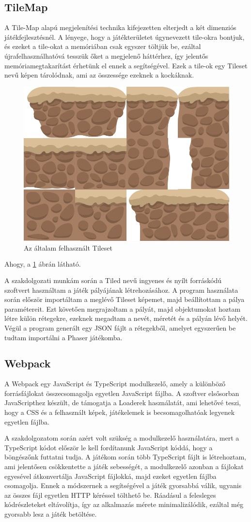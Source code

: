 \documentclass[12pt, a4paper]{report}
\theoremstyle{definition}
\begin{document}
	\subsection{TileMap}
	A Tile-Map alapú megjelenítési technika kifejezetten elterjedt a két dimenziós játékfejlesztésnél. A lényege, hogy a játékterületet úgynevezett tile-okra bontjuk, és ezeket a tile-okat a memóriában csak egyszer töltjük be, ezáltal újrafelhasználhatóvá tesszük őket a megjelenő háttérhez, így jelentős memóriamegtakarítást érhetünk el ennek a segítségével. Ezek a tile-ok egy Tileset nevű képen tárolódnak, ami az összessége ezeknek a kockáknak.
	\begin{figure}[!h]
		\centering
		\includegraphics[width=0.4\linewidth]{./images/tile.png}
		\caption{Az általam felhasznált Tileset}
		\label{fig:tileset}
	\end{figure}
	Ahogy, a \ref{fig:tileset} ábrán látható.
	
	A szakdolgozati munkám során a Tiled nevű ingyenes és nyílt forráskódú szoftvert használtam a játék pályájának létrehozásához. A program használata során először importáltam a meglévő Tileset képemet, majd beállítottam a pálya paramétereit. Ezt követően megrajzoltam a pályát, majd objektumokat hoztam létre külön rétegekre, ezeknek megadtam a nevét, méretét és a pályán lévő helyét. Végül a program generált egy JSON fájlt a rétegekből, amelyet egyszerűen be tudtam importálni a Phaser játékomba.  
	
	
	\subsection{Webpack}
	A Webpack egy JavaScript és TypeScript modulkezelő, amely a különböző forrásfájlokat összecsomagolja egyetlen JavaScript fájlba. A szoftver elsősorban JavaScripthez készült, de támogatja a Loaderek használatát, ami lehetővé teszi, hogy a CSS és a felhasznált képek, játékelemek is becsomagolhatóak legyenek egyetlen fájlba. 
	
	A szakdolgozatom során azért volt szükség a modulkezelő használatára, mert a TypeScript kódot először le kell fordítanunk JavaScript kóddá, hogy a böngészőnk futtatni tudja. A játékom során több TypeScript fájlt is létrehoztam, ami jelentősen csökkentette a játék sebességét, a modulkezelő azonban a fájlokat egyesével átkonvertálja JavaScript fájlokká, majd ezeket egyetlen fájlba csomagolja. Ennek a módszernek a segítségével a játék gyorsabbá válik, ugyanis az összes fájl egyetlen HTTP kéréssel tölthető be. Ráadásul a felesleges kódrészleteket eltávolítja, így az alkalmazás mérete minimalizálódik, ezáltal még gyorsabb lesz a játék betöltése.
	
\end{document}
